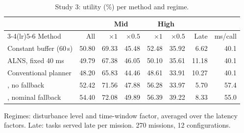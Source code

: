 \begin{table}[t]
\caption{Study 3: utility (\%) per method and regime.}\label{tab:s3}
\centering\small
\begin{threeparttable}
\begin{tabular}{lrrrrrrr}
\toprule
& & \multicolumn{2}{c}{Mid} & \multicolumn{2}{c}{High} & & \\
\cmidrule(lr){3-4}\cmidrule(lr){5-6}
Method & All & $\times 1$ & $\times 0.5$ & $\times 1$ & $\times 0.5$ & Late & ms/call \\
\midrule
Constant buffer (60\,s) & 50.80 & 69.33 & 45.48 & 52.48 & 35.92 & 6.62 & 40.1 \\
ALNS, fixed 40 ms & 49.79 & 67.38 & 46.05 & 50.10 & 35.61 & 11.18 & 40.1 \\
Conventional planner & 48.20 & 65.83 & 44.46 & 48.61 & 33.91 & 10.27 & 40.1 \\
\mname{}, no fallback & 52.42 & 71.56 & 47.88 & 56.28 & 33.97 & 5.70 & 57.4 \\
\mname{}, nominal fallback & 54.40 & 72.08 & 49.89 & 56.39 & 39.22 & 8.33 & 55.0 \\
\bottomrule
\end{tabular}
\begin{tablenotes}[flushleft]\scriptsize
\item[] Regimes: disturbance level and time-window factor, averaged over the latency factors. Late: tasks served late per mission. 270 missions, 12 configurations.
\end{tablenotes}
\end{threeparttable}
\end{table}
